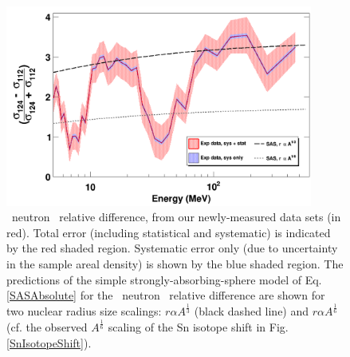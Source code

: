 \begin{figure}[tb]
    \centering
    \includegraphics[width=0.9\textwidth]{figures/relativeDiff_Sn124Sn112.png}
    \caption[\snTwelveFour\ neutron \tot\ relative difference]
    {
        \snTwelveFour\ neutron \tot\ relative difference, from our newly-measured
        data sets (in red). Total error (including statistical and systematic)
        is indicated by the red shaded region. Systematic error only (due to
        uncertainty in the sample areal density) is shown by the blue shaded region.   
        The predictions of the simple strongly-absorbing-sphere model of
        Eq. \ref{SASAbsolute} for the \snTwelveFour\ neutron \tot\ relative
        difference are shown for two nuclear radius size scalings: $r \alpha A^{\frac{1}{3}}$
        (black dashed line) and $r \alpha A^{\frac{1}{6}}$
        (cf. the observed $A^{\frac{1}{6}}$ scaling of the Sn isotope shift in Fig.
        \ref{SnIsotopeShift}).
    }
    \label{IsotopicDifferenceSn}
\end{figure}

\afterpage{\clearpage}
